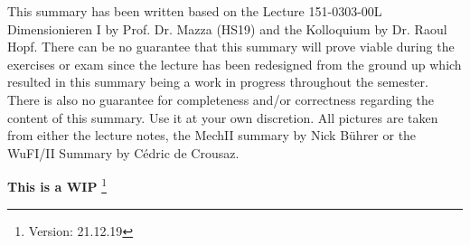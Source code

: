 



\maketitle
\begin{center}
    This summary has been written based on the Lecture 151-0303-00L  Dimensionieren I by Prof. Dr. Mazza (HS19) and the Kolloquium by Dr. Raoul Hopf. There can be no guarantee that this summary will prove viable during the exercises or exam since the lecture has been redesigned from the ground up which resulted in this summary being a work in progress throughout the semester. There is also no guarantee for completeness and/or correctness regarding the content of this summary. Use it at your own discretion. All pictures are taken from either the lecture notes, the MechII summary by Nick Bührer or the WuFI/II Summary by Cédric de Crousaz.
    
    \textbf{This is a WIP} 
    \footnote{\label{foot:2}Version: 21.12.19}
\end{center}
\newpage
\begin{multicols*}{3}




















\end{multicols*}     

